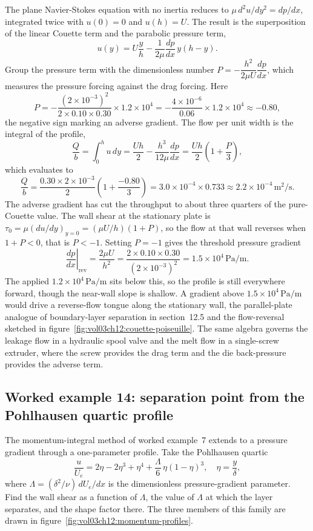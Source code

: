The plane Navier-Stokes equation with no inertia reduces to
$\mu\,d^2u/dy^2 = dp/dx$, integrated twice with $u(0) = 0$ and
$u(h) = U$. The result is the superposition of the linear Couette
term and the parabolic pressure term,
\[
u(y) = U\frac{y}{h} - \frac{1}{2\mu}\frac{dp}{dx}\,y(h - y).
\]
Group the pressure term with the dimensionless number
$P = -\dfrac{h^2}{2\mu U}\dfrac{dp}{dx}$, which measures the
pressure forcing against the drag forcing. Here
\[
P = -\frac{(2\times10^{-3})^2}{2\times0.10\times0.30}\times
1.2\times10^{4} = -\frac{4\times10^{-6}}{0.06}\times1.2\times10^{4}
\approx -0.80,
\]
the negative sign marking an adverse gradient. The flow per unit
width is the integral of the profile,
\[
\frac{Q}{b} = \int_0^h u\,dy = \frac{Uh}{2} - \frac{h^3}{12\mu}
\frac{dp}{dx} = \frac{Uh}{2}\left(1 + \frac{P}{3}\right),
\]
which evaluates to
\[
\frac{Q}{b} = \frac{0.30\times2\times10^{-3}}{2}\left(1 +
\frac{-0.80}{3}\right) = 3.0\times10^{-4}\times0.733 \approx
2.2\times10^{-4}\,\si{\meter\squared\per\second}.
\]
The adverse gradient has cut the throughput to about three quarters
of the pure-Couette value. The wall shear at the stationary plate
is $\tau_0 = \mu(du/dy)_{y=0} = (\mu U/h)(1 + P)$, so the flow at
that wall reverses when $1 + P < 0$, that is $P < -1$. Setting
$P = -1$ gives the threshold pressure gradient
\[
\left.\frac{dp}{dx}\right|_{\text{rev}} = \frac{2\mu U}{h^2} =
\frac{2\times0.10\times0.30}{(2\times10^{-3})^2} = 1.5\times10^{4}
\,\si{\pascal\per\meter}.
\]
The applied $1.2\times10^{4}\,\si{\pascal\per\meter}$ sits below
this, so the profile is still everywhere forward, though the
near-wall slope is shallow. A gradient above $1.5\times10^{4}\,\si{
\pascal\per\meter}$ would drive a reverse-flow tongue along the
stationary wall, the parallel-plate analogue of boundary-layer
separation in section~12.5 and the flow-reversal sketched in
figure~\ref{fig:vol03ch12:couette-poiseuille}. The same algebra
governs the leakage flow in a hydraulic spool valve and the melt
flow in a single-screw extruder, where the screw provides the
drag term and the die back-pressure provides the adverse term.

\subsection*{Worked example 14: separation point from the Pohlhausen quartic profile}

The momentum-integral method of worked example~7 extends to a
pressure gradient through a one-parameter profile. Take the
Pohlhausen quartic
\[
\frac{u}{U_e} = 2\eta - 2\eta^3 + \eta^4 + \frac{\Lambda}{6}\,
\eta(1-\eta)^3, \quad \eta = \frac{y}{\delta},
\]
where $\Lambda = (\delta^2/\nu)\,dU_e/dx$ is the dimensionless
pressure-gradient parameter. Find the wall shear as a function of
$\Lambda$, the value of $\Lambda$ at which the layer separates, and
the shape factor there. The three members of this family are drawn
in figure~\ref{fig:vol03ch12:momentum-profiles}.

